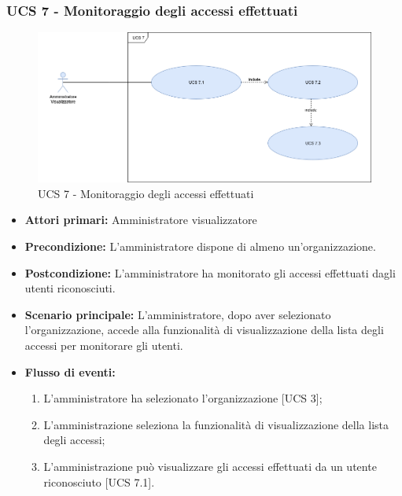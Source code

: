 
\subsubsection{UCS 7 - Monitoraggio degli accessi effettuati}
\begin{figure}[h]
	\centering
	\includegraphics[scale=0.3]{sezioni/UseCase/Immagini/UCS7.png}
	\caption{UCS 7 - Monitoraggio degli accessi effettuati}
\end{figure}

\begin{itemize}
\item \textbf{Attori primari:} Amministratore visualizzatore
\item \textbf{Precondizione:} L'amministratore dispone di almeno un'organizzazione.
\item \textbf{Postcondizione:} L'amministratore ha monitorato gli accessi effettuati dagli utenti riconosciuti.
\item \textbf{Scenario principale:} L'amministratore, dopo aver selezionato l'organizzazione, accede alla funzionalità di visualizzazione della lista degli accessi per monitorare gli utenti.
\item \textbf{Flusso di eventi:} 
\begin{enumerate}
	\item L'amministratore ha selezionato l'organizzazione [UCS 3];
	\item L'amministrazione seleziona la funzionalità di visualizzazione della lista degli accessi;
	\item L'amministrazione può visualizzare gli accessi effettuati da un utente riconosciuto [UCS 7.1].
\end{enumerate}
\end{itemize}

